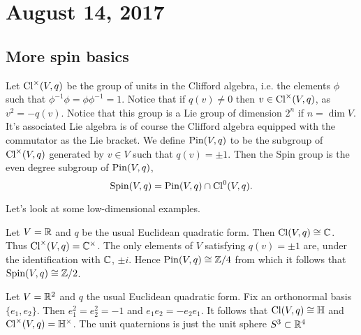 \documentclass{amsart}
\begin{document}
\section{August 14, 2017}

\subsection{More spin basics}

Let $\operatorname{Cl}^\times(V,q)$ be the group of units in the Clifford algebra, i.e. the elements
$\phi$ such that $\phi^{-1}\phi=\phi\phi^{-1}=1$. Notice that if $q(v)\neq 0$ then
$v\in\operatorname{Cl}^\times(V,q)$, as $v^2=-q(v)$. Notice that this group is a Lie group of dimension
$2^n$ if $n=\dim V$. It's associated Lie algebra is of course the Clifford algebra
equipped with the commutator as the Lie bracket. We define $\operatorname{Pin}(V,q)$ to be the subgroup
of $\operatorname{Cl}^\times(V,q)$ generated by $v\in V$ such that $q(v)=\pm 1$. Then the Spin group is
the even degree subgroup of $\operatorname{Pin}(V,q)$,
\begin{equation*}
    \operatorname{Spin}(V,q) = \operatorname{Pin}(V,q) \cap \operatorname{Cl}^0(V,q).
\end{equation*}

Let's look at some low-dimensional examples.
\begin{example}
    Let $V=\mathbb{R}$ and $q$ be the usual Euclidean quadratic form. Then $\operatorname{Cl}(V,q)\cong\mathbb{C}$.
    Thus $\operatorname{Cl}^\times(V,q)=\mathbb{C}^\times$. The only elements of $V$ satisfying $q(v)=\pm 1$
    are, under the identification with $\mathbb{C}$, $\pm i$. Hence $\operatorname{Pin}(V,q)\cong \mathbb{Z}/4$ from
    which it follows that $\operatorname{Spin}(V,q)\cong\mathbb{Z}/2$.
\end{example}

\begin{example}
    Let $V=\mathbb{R}^2$ and $q$ the usual Euclidean quadratic form. Fix an orthonormal basis
    $\{e_1,e_2\}$. Then $e_1^2=e_2^2=-1$ and $e_1e_2=-e_2e_1$. It follows that
    $\operatorname{Cl}(V,q)\cong\mathbb{H}$ and $\operatorname{Cl}^\times(V,q)=\mathbb{H}^\times$. The unit
    quaternions is just the unit sphere $S^3\subset\mathbb{R}^4$
\end{example}






\end{document}

